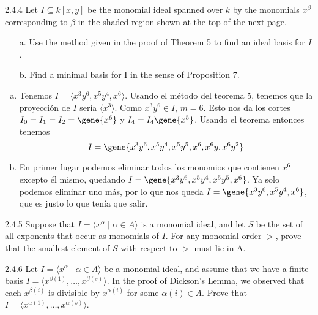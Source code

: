 \documentclass[twoside]{article}
\begin{document}
\begin{ejercicio}{2.4.4}
Let $I ⊆ k[x, y]$ be the monomial ideal spanned over $k$ by the monomials $x^{β}$ corresponding
to $β$ in the shaded region shown at the top of the next page.
\begin{enumerate}
\item[a.] Use the method given in the proof of Theorem 5 to find an ideal basis for $I$.
\item[b.] Find a minimal basis for I in the sense of Proposition 7.
\end{enumerate}
\end{ejercicio}
\begin{solucion}
\begin{enumerate}[a.]
\item Tenemos $I=\langle x^3y^6,x^5y^4, x^6\rangle$. Usando el método del teorema 5, tenemos que la proyección de $I$ sería $\langle x^3\rangle$. Como $x^3y^6\in I$, $m=6$. Esto nos da los cortes $I_0=I_1=I_2=\gene{x^6}$ y $I_4=I_4\gene{x^5}$. Usando el teorema entonces tenemos $$I=\gene{ x^3y^6,x^5y^4,x^5y^5, x^6,x^6y, x^6y^2}$$
\item En primer lugar podemos eliminar todos los monomios que contienen $x^6$ excepto él mismo, quedando $I=\gene{ x^3y^6,x^5y^4,x^5y^5, x^6}$. Ya solo podemos eliminar uno más, por lo que nos queda $I=\gene{ x^3y^6,x^5y^4, x^6}$, que es justo lo que tenía que salir.
\end{enumerate}
\end{solucion}
\newpage

\begin{ejercicio}{2.4.5}
Suppose that $I =\langle 
x^{α} \mid α ∈ A\rangle$ is a monomial ideal, and let $S$ be the set of all exponents
that occur as monomials of $I$. For any monomial order $>$, prove that the smallest element
of $S$ with respect to $>$ must lie in A.
\end{ejercicio}
\begin{solucion}

\end{solucion}

\newpage

\begin{ejercicio}{2.4.6}
Let $I =\langle 
x^{α} \mid α ∈ A\rangle$ be a monomial ideal, and assume that we have a finite basis
$I =\langle 
x^{β(1)},\dots , x^{β(s)}\rangle$. In the proof of Dickson’s Lemma, we observed that each $x^{β(i)}$ is
divisible by $x^{α(i)}$ for some $α(i) ∈ A$. Prove that $I =\langle 
x^{α(1)},\dots , x^{α(s)}\rangle$.
\end{ejercicio}
\begin{solucion}

\end{solucion}
\end{document}
